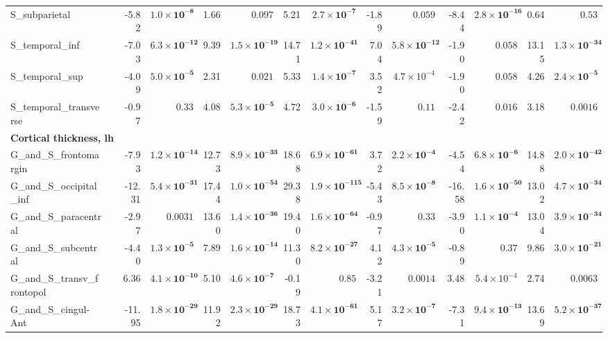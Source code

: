 {\begin{longtable}{llrrrrrrrrrrrr}
S\_subparietal &  & -5.82 & $\mathbf{1.0{\times}10^{-8}}$ & 1.66 & $0.097$ & 5.21 & $\mathbf{2.7{\times}10^{-7}}$ & -1.89 & $0.059$ & -8.44 & $\mathbf{2.8{\times}10^{-16}}$ & 0.64 & $0.53$ \\
S\_temporal\_inf &  & -7.03 & $\mathbf{6.3{\times}10^{-12}}$ & 9.39 & $\mathbf{1.5{\times}10^{-19}}$ & 14.71 & $\mathbf{1.2{\times}10^{-41}}$ & 7.04 & $\mathbf{5.8{\times}10^{-12}}$ & -1.90 & $0.058$ & 13.15 & $\mathbf{1.3{\times}10^{-34}}$ \\
S\_temporal\_sup &  & -4.09 & $\mathbf{5.0{\times}10^{-5}}$ & 2.31 & $0.021$ & 5.33 & $\mathbf{1.4{\times}10^{-7}}$ & 3.52 & $4.7{\times}10^{-4}$ & -1.90 & $0.058$ & 4.26 & $\mathbf{2.4{\times}10^{-5}}$ \\
S\_temporal\_transverse &  & -0.97 & $0.33$ & 4.08 & $\mathbf{5.3{\times}10^{-5}}$ & 4.72 & $\mathbf{3.0{\times}10^{-6}}$ & -1.59 & $0.11$ & -2.42 & $0.016$ & 3.18 & $0.0016$ \\
\midrule\multicolumn{14}{l}{\textbf{Cortical thickness, lh}} \\
G\_and\_S\_frontomargin &  & -7.93 & $\mathbf{1.2{\times}10^{-14}}$ & 12.73 & $\mathbf{8.9{\times}10^{-33}}$ & 18.68 & $\mathbf{6.9{\times}10^{-61}}$ & 3.72 & $\mathbf{2.2{\times}10^{-4}}$ & -4.54 & $\mathbf{6.8{\times}10^{-6}}$ & 14.88 & $\mathbf{2.0{\times}10^{-42}}$ \\
G\_and\_S\_occipital\_inf &  & -12.31 & $\mathbf{5.4{\times}10^{-31}}$ & 17.44 & $\mathbf{1.0{\times}10^{-54}}$ & 29.38 & $\mathbf{1.9{\times}10^{-115}}$ & -5.43 & $\mathbf{8.5{\times}10^{-8}}$ & -16.58 & $\mathbf{1.6{\times}10^{-50}}$ & 13.02 & $\mathbf{4.7{\times}10^{-34}}$ \\
G\_and\_S\_paracentral &  & -2.97 & $0.0031$ & 13.60 & $\mathbf{1.4{\times}10^{-36}}$ & 19.40 & $\mathbf{1.6{\times}10^{-64}}$ & -0.97 & $0.33$ & -3.90 & $\mathbf{1.1{\times}10^{-4}}$ & 13.04 & $\mathbf{3.9{\times}10^{-34}}$ \\
G\_and\_S\_subcentral &  & -4.40 & $\mathbf{1.3{\times}10^{-5}}$ & 7.89 & $\mathbf{1.6{\times}10^{-14}}$ & 11.30 & $\mathbf{8.2{\times}10^{-27}}$ & 4.12 & $\mathbf{4.3{\times}10^{-5}}$ & -0.89 & $0.37$ & 9.86 & $\mathbf{3.0{\times}10^{-21}}$ \\
G\_and\_S\_transv\_frontopol &  & 6.36 & $\mathbf{4.1{\times}10^{-10}}$ & 5.10 & $\mathbf{4.6{\times}10^{-7}}$ & -0.19 & $0.85$ & -3.21 & $0.0014$ & 3.48 & $5.4{\times}10^{-4}$ & 2.74 & $0.0063$ \\
G\_and\_S\_cingul-Ant &  & -11.95 & $\mathbf{1.8{\times}10^{-29}}$ & 11.92 & $\mathbf{2.3{\times}10^{-29}}$ & 18.73 & $\mathbf{4.1{\times}10^{-61}}$ & 5.17 & $\mathbf{3.2{\times}10^{-7}}$ & -7.31 & $\mathbf{9.4{\times}10^{-13}}$ & 13.69 & $\mathbf{5.2{\times}10^{-37}}$ \\

\end{longtable}}

